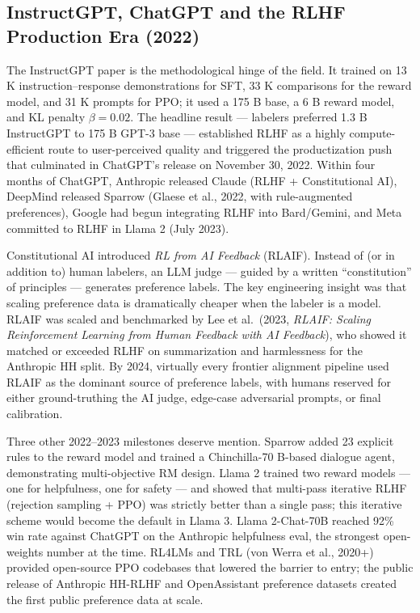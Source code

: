 \documentclass{article}
\begin{document}
\subsection{InstructGPT, ChatGPT and the RLHF Production Era (2022)}\label{instructgpt-chatgpt-and-the-rlhf-production-era-2022}

The InstructGPT paper \citep{ouyang20222022} is the methodological hinge of the field. It trained on 13 K instruction--response demonstrations for SFT, 33 K comparisons for the reward model, and 31 K prompts for PPO; it used a 175 B base, a 6 B reward model, and KL penalty \(\beta = 0.02\). The headline result --- labelers preferred 1.3 B InstructGPT to 175 B GPT-3 base --- established RLHF as a highly compute-efficient route to user-perceived quality and triggered the productization push that culminated in ChatGPT's release on November 30, 2022. Within four months of ChatGPT, Anthropic released Claude (RLHF + Constitutional AI), DeepMind released Sparrow (Glaese et al., 2022, with rule-augmented preferences), Google had begun integrating RLHF into Bard/Gemini, and Meta committed to RLHF in Llama 2 (July 2023).

Constitutional AI \citep{bai20222022} introduced \emph{RL from AI Feedback} (RLAIF). Instead of (or in addition to) human labelers, an LLM judge --- guided by a written ``constitution'' of principles --- generates preference labels. The key engineering insight was that scaling preference data is dramatically cheaper when the labeler is a model. RLAIF was scaled and benchmarked by Lee et al.~(2023, \emph{RLAIF: Scaling Reinforcement Learning from Human Feedback with AI Feedback}), who showed it matched or exceeded RLHF on summarization and harmlessness for the Anthropic HH split. By 2024, virtually every frontier alignment pipeline used RLAIF as the dominant source of preference labels, with humans reserved for either ground-truthing the AI judge, edge-case adversarial prompts, or final calibration.

Three other 2022--2023 milestones deserve mention. Sparrow \citep{glaese20222022} added 23 explicit rules to the reward model and trained a Chinchilla-70 B-based dialogue agent, demonstrating multi-objective RM design. Llama 2 \citep{touvron20232023} trained two reward models --- one for helpfulness, one for safety --- and showed that multi-pass iterative RLHF (rejection sampling + PPO) was strictly better than a single pass; this iterative scheme would become the default in Llama 3. Llama 2-Chat-70B reached 92\% win rate against ChatGPT on the Anthropic helpfulness eval, the strongest open-weights number at the time. RL4LMs \citep{ramamurthy2023rl4lmsisreinforcem} and TRL (von Werra et al., 2020+) provided open-source PPO codebases that lowered the barrier to entry; the public release of Anthropic HH-RLHF and OpenAssistant preference datasets created the first public preference data at scale.
\end{document}
